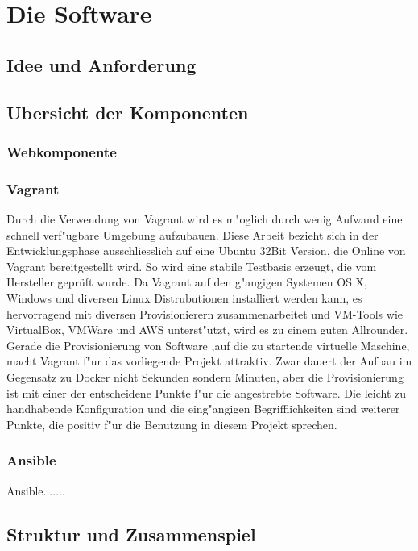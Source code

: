 \setcounter{secnumdepth}{3}
\chapter{Die Software}

\section{Idee und Anforderung}



\section{Ubersicht der Komponenten}
\subsection{Webkomponente}
\subsection{Vagrant}

Durch die Verwendung von Vagrant wird es m"oglich durch wenig Aufwand eine schnell verf"ugbare Umgebung aufzubauen.
Diese Arbeit bezieht sich in der Entwicklungsphase ausschliesslich auf eine Ubuntu 32Bit Version, die Online von Vagrant bereitgestellt wird.
So wird eine stabile Testbasis erzeugt, die vom Hersteller geprüft wurde.
Da Vagrant auf den g"angigen Systemen OS X, Windows und diversen Linux Distrubutionen installiert werden kann, es hervorragend mit diversen Provisionierern zusammenarbeitet und VM-Tools wie VirtualBox, VMWare und AWS unterst"utzt, wird es zu einem guten Allrounder. 
Gerade die Provisionierung von Software ,auf die zu startende virtuelle Maschine, macht Vagrant f"ur das vorliegende Projekt attraktiv.
Zwar dauert der Aufbau im Gegensatz zu Docker nicht Sekunden sondern Minuten, aber die Provisionierung ist mit einer der entscheidene Punkte f"ur die angestrebte Software.
Die leicht zu handhabende Konfiguration und die eing"angigen Begrifflichkeiten sind weiterer Punkte, die positiv f"ur die Benutzung in diesem Projekt sprechen.


\subsection{Ansible}
 Ansible.......


\section{Struktur und Zusammenspiel}
